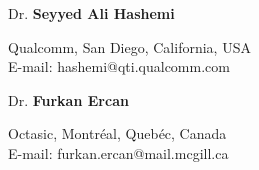 \documentclass[10pt]{article}
\newenvironment{innerlist}[1][\enskip$\circ$]%
{\begin{compactitem}[#1]}{\end{compactitem}}
\begin{document}
	\halfblankline
	Dr. \textbf{Seyyed Ali Hashemi}
	\begin{innerlist}
		\item[] 
		Qualcomm, San Diego, California, USA\\
		{E-mail: hashemi@qti.qualcomm.com}
	\end{innerlist}	

	\halfblankline
	Dr. \textbf{Furkan Ercan}
	\begin{innerlist}
		\item[] 
		Octasic, Montr\'eal, Queb\'ec, Canada\\
		{E-mail: furkan.ercan@mail.mcgill.ca}
	\end{innerlist}	
\end{document}
